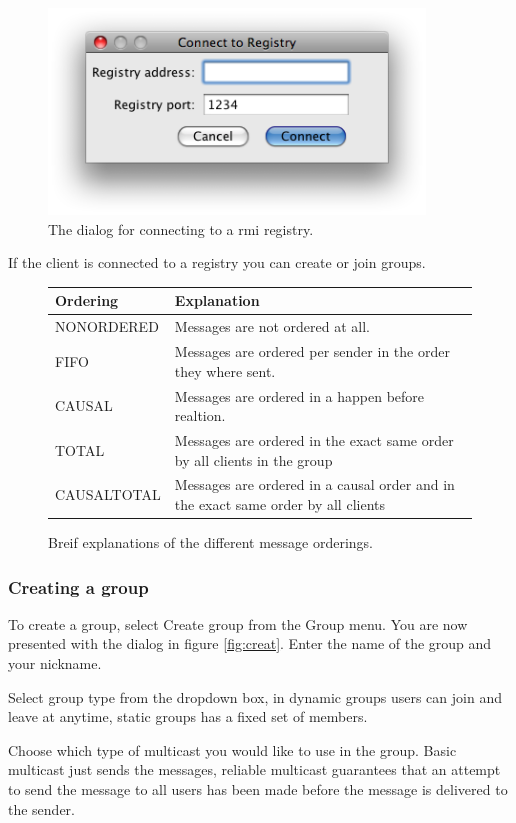 \documentclass[english]{article}
\begin{document}
\begin{figure}
\centering \includegraphics[width=10cm]{gui5.png}
\caption{The dialog for connecting to a rmi registry.}
\label{fig:contoreg}
\end{figure}

If the client is connected to a registry you can create or join groups.

\begin{figure}
\begin{tabular}{|l|p{9cm}|}
\hline
Ordering & Explanation \\
\hline
NONORDERED 	& Messages are not ordered at all. \\
FIFO		& Messages are ordered per sender in the order they where sent. \\
CAUSAL		& Messages are ordered in a happen before realtion. \\
TOTAL		& Messages are ordered in the exact same order by all clients in the group \\
CAUSALTOTAL & Messages are ordered in a causal order and in the exact same order by all clients \\
\hline
\end{tabular}
\caption{Breif explanations of the different message orderings.}
\label{tab:ordering}
\end{figure}

\subsubsection{Creating a group}
To create a group, select Create group from the Group menu. You are now presented with the dialog in figure \vref{fig:creat}. Enter the name of the group and your nickname.

Select group type from the dropdown box, in dynamic groups users can join and leave at anytime, static groups has a fixed set of members.

Choose which type of multicast you would like to use in the group. Basic multicast just sends the messages, reliable multicast guarantees that an attempt to send the message to all users has been made before the message is delivered to the sender.
\end{document}
